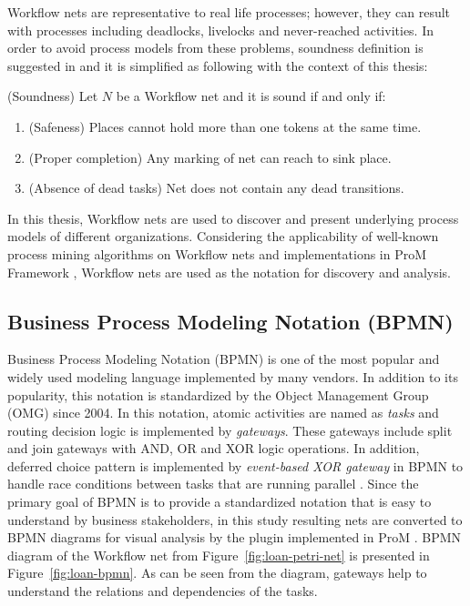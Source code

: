 Workflow nets are representative to real life processes; however, they can result with processes including deadlocks, livelocks and never-reached activities. In order to avoid process models from these problems, soundness definition is suggested in \cite{van1998application} and it is simplified as following with the context of this thesis:

\theoremstyle{definition}
\begin{definition}{}
(Soundness) Let $N$ be a Workflow net and it is sound if and only if:
\begin{enumerate}
  \item  (Safeness) Places cannot hold more than one tokens at the same time.
  \item  (Proper completion) Any marking of net can reach to sink place.
  \item  (Absence of dead tasks) Net does not contain any dead transitions.  
\end{enumerate}
\end{definition}

In this thesis, Workflow nets are used to discover and present underlying process models of different organizations. Considering the applicability of well-known process mining algorithms on Workflow nets and implementations in ProM Framework \cite{verbeek2010prom}, Workflow nets are used as the notation for discovery and analysis.

\subsection{Business Process Modeling Notation (BPMN)}
\label{sec:bpmn} 
Business Process Modeling Notation (BPMN) is one of the most popular and widely used modeling language implemented by many vendors. In addition to its popularity, this notation is standardized by the Object Management Group (OMG) since 2004. In this notation, atomic activities are named as \textit{tasks} and routing decision logic is implemented by \textit{gateways}. These gateways include split and join gateways with AND, OR and XOR logic operations. In addition, deferred choice pattern is implemented by \textit{event-based XOR gateway} in BPMN to handle race conditions between tasks that are running parallel \cite{van2003workflow}. Since the primary goal of BPMN is to provide a standardized notation that is easy to understand by business stakeholders, in this study resulting nets are converted to BPMN diagrams for visual analysis by the plugin implemented in ProM \cite{kalenkovaprocess}. BPMN diagram of the Workflow net from Figure~\ref{fig:loan-petri-net} is presented in Figure~\ref{fig:loan-bpmn}. As can be seen from the diagram, gateways help to understand the relations and dependencies of the tasks.

